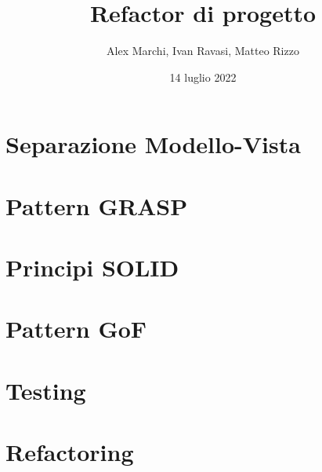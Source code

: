 \documentclass{beamer}
\begin{document}
    \title{Refactor di progetto}
    \author{Alex Marchi, Ivan Ravasi, Matteo Rizzo}
    \date{14 luglio 2022}

    \frame{\titlepage}

    


    \section{Separazione Modello-Vista}
    

    \section{Pattern GRASP}
    

    \section{Principi SOLID}
    

    \section{Pattern GoF}
    

    \section{Testing}
    

    \section{Refactoring}
    
\end{document}
